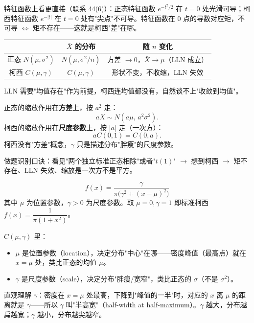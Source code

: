 \begin{dxtips}
特征函数上看更直接（联系 44(6)）：正态特征函数 $e^{-t^2/2}$ 在 $t=0$ 处光滑可导；柯西特征函数 $e^{-|t|}$ 在 $t=0$ 处有"尖点"不可导。特征函数在 $0$ 点的导数对应矩，不可导 $\iff$ 矩不存在——这就是柯西"差"在哪。
\end{dxtips}

\begin{note}
\begin{center}
\begin{tabular}{c|c|c}
 & $\bar X$ 的分布 & 随 $n$ 变化 \\\hline
正态 $N(\mu,\sigma^2)$ & $N(\mu,\sigma^2/n)$ & 方差 $\to 0$，$\bar X\to\mu$（LLN 成立） \\
柯西 $C(\mu,\gamma)$ & $C(\mu,\gamma)$ & 形状不变，不收缩，LLN 失效
\end{tabular}
\end{center}
LLN 需要"均值存在"作为前提，柯西连均值都没有，自然谈不上"收敛到均值"。
\end{note}

\begin{note}[尺度性质]
正态的缩放作用在\textbf{方差}上，按 $a^2$ 走：
$$aX\sim N(a\mu,\,a^2\sigma^2).$$
柯西的缩放作用在\textbf{尺度参数}上，按 $|a|$ 走（一次方）：
$$aC(0,1)=C(0,a).$$
柯西没有"方差"概念，$\gamma$ 只是描述分布"胖瘦"的尺度参数。
\end{note}

\begin{dxtips}
做题识别口诀：看见"两个独立标准正态相除"或者"$t(1)$" $\to$ 想到柯西 $\to$ 矩不存在、LLN 失效、缩放是一次方不是平方。
\end{dxtips}
 \begin{definition}
$$f(x)=\frac{\gamma}{\pi\big(\gamma^2+(x-\mu)^2\big)}$$
其中 $\mu$ 为位置参数，$\gamma>0$ 为尺度参数。取 $\mu=0,\gamma=1$ 即标准柯西 $f(x)=\dfrac{1}{\pi(1+x^2)}$。
\end{definition}

\begin{dxtips}
$C(\mu,\gamma)$ 里：
\begin{itemize}
  \item $\mu$ 是位置参数（location），决定分布"中心"在哪——密度峰值（最高点）就在 $x=\mu$ 处，类比正态的均值 $\mu$。
  \item $\gamma$ 是尺度参数（scale），决定分布"胖瘦/宽窄"，类比正态的 $\sigma$（不是 $\sigma^2$）。
\end{itemize}

直观理解 $\gamma$：密度在 $x=\mu$ 处最高，下降到"峰值的一半"时，对应的 $x$ 离 $\mu$ 的距离就是 $\gamma$——所以 $\gamma$ 叫"半高宽"（half-width at half-maximum）。$\gamma$ 越大，分布越扁越宽；$\gamma$ 越小，分布越尖越窄。
\end{dxtips}

